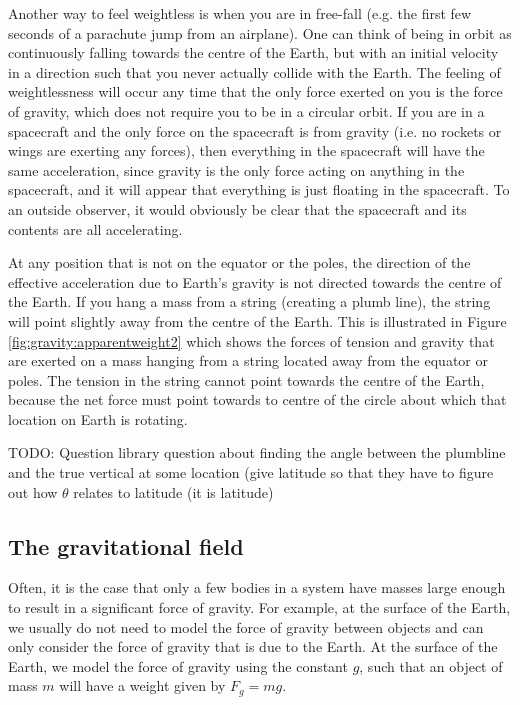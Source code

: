  Another way to feel weightless is when you are in free-fall (e.g. the first few seconds of a parachute jump from an airplane). One can think of being in orbit as continuously falling towards the centre of the Earth, but with an initial velocity in a direction such that you never actually collide with the Earth. The feeling of weightlessness will occur any time that the only force exerted on you is the force of gravity, which does not require you to be in a circular orbit. If you are in a spacecraft and the only force on the spacecraft is from gravity (i.e. no rockets or wings are exerting any forces), then everything in the spacecraft will have the same acceleration, since gravity is the only force acting on anything in the spacecraft, and it will appear that everything is just floating in the spacecraft. To an outside observer, it would obviously be clear that the spacecraft and its contents are all accelerating.

At any position that is not on the equator or the poles, the direction of the effective acceleration due to Earth's gravity is not directed towards the centre of the Earth. If you hang a mass from a string (creating a plumb line), the string will point slightly away from the centre of the Earth. This is illustrated in Figure \ref{fig:gravity:apparentweight2} which shows the forces of tension and gravity that are exerted on a mass hanging from a string located away from the equator or poles. The tension in the string cannot point towards the centre of the Earth, because the net force must point towards to centre of the circle about which that location on Earth is rotating. 

TODO: Question library question about finding the angle between the plumbline and the true vertical at some location (give latitude so that they have to figure out how $\theta$ relates to latitude (it is latitude)

\subsection{The gravitational field}
Often, it is the case that only a few bodies in a system have masses large enough to result in a significant force of gravity. For example, at the surface of the Earth, we usually do not need to model the force of gravity between objects and can only consider the force of gravity that is due to the Earth. At the surface of the Earth, we model the force of gravity using the constant $g$, such that an object of mass $m$ will have a weight given by $F_g = mg$. 

